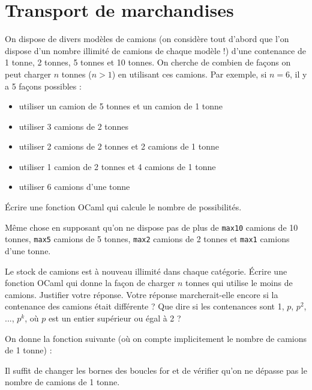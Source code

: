 \renewcommand{\SourceFile}{3-strategies-gloutonnes/src/3-4.ml}

\section{Transport de marchandises}

On dispose de divers modèles de camions (on considère tout d'abord que l'on dispose d'un nombre illimité de camions de chaque modèle !) d'une contenance de 1 tonne, 2 tonnes, 5 tonnes et 10 tonnes. On cherche de combien de façons on peut charger $n$ tonnes ($n > 1$) en utilisant ces camions. Par exemple, si $n=6$, il y a 5 façons possibles :
\begin{itemize}
    \item utiliser un camion de 5 tonnes et un camion de 1 tonne
    \item utiliser 3 camions de 2 tonnes
    \item utiliser 2 camions de 2 tonnes et 2 camions de 1 tonne
    \item utiliser 1 camion de 2 tonnes et 4 camions de 1 tonne
    \item utiliser 6 camions d'une tonne
\end{itemize}

\Q
Écrire une fonction OCaml qui calcule le nombre de possibilités.

\Q
Même chose en supposant qu'on ne dispose pas de plus de \texttt{max10} camions de 10 tonnes, \texttt{max5} camions de 5 tonnes, \texttt{max2} camions de 2 tonnes et \texttt{max1} camions d'une tonne.

\Q
Le stock de camions est à nouveau illimité dans chaque catégorie. Écrire une fonction OCaml qui donne la façon de charger $n$ tonnes qui utilise le moins de camions. Justifier votre réponse. Votre réponse marcherait-elle encore si la contenance des camions était différente ? Que dire si les contenances sont 1, $p$, $p^2$, ..., $p^k$, où $p$ est un entier supérieur ou égal à 2 ?

\Corrige

\Q
On donne la fonction suivante (où on compte implicitement le nombre de camions de 1 tonne) :



\Q
Il suffit de changer les bornes des boucles \og for \fg{} et de vérifier qu'on ne dépasse pas le nombre de camions de 1 tonne.



